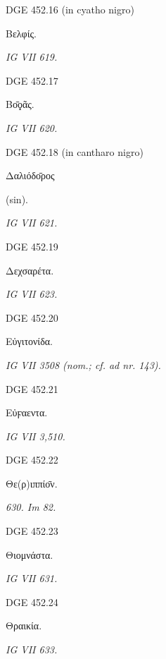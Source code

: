 \begin{versi}{DGE 452.16}
(in cyatho nigro)
\begin{greek}
Βελφίς.
\end{greek}
\end{versi}
\textit{IG VII 619.}

\begin{versi}{DGE 452.17}
\begin{greek}
Βο̄ϙᾶς.
\end{greek}
\end{versi}
\textit{IG VII 620.}

\begin{versi}{DGE 452.18}
(in cantharo nigro)
\begin{greek}
Δαλιόδο̄ρος
\end{greek}
(sin).
\end{versi}
\textit{IG VII 621.}

\begin{versi}{DGE 452.19}
\begin{greek}
Δεχσαρέτα.
\end{greek}
\end{versi}
\textit{IG VII 623.}

\begin{versi}{DGE 452.20}
\begin{greek}
Εὐγιτονίδα.
\end{greek}
\end{versi}
\textit{IG VII 3508 (nom.; cf. ad nr. 143).}

\begin{versi}{DGE 452.21}
\begin{greek}
Εὐϝαεντα.
\end{greek}
\end{versi}
\textit{IG VII 3,510.}

\begin{versi}{DGE 452.22}
\begin{greek}
Θε(ρ)ιππίο̄ν.
\end{greek}
\end{versi}
\textit{630. Im 82.}

\begin{versi}{DGE 452.23}
\begin{greek}
Θιομνάστα.
\end{greek}
\end{versi}
\textit{IG VII 631.}

\begin{versi}{DGE 452.24}
\begin{greek}
Θραικία.
\end{greek}
\end{versi}
\textit{IG VII 633.}

